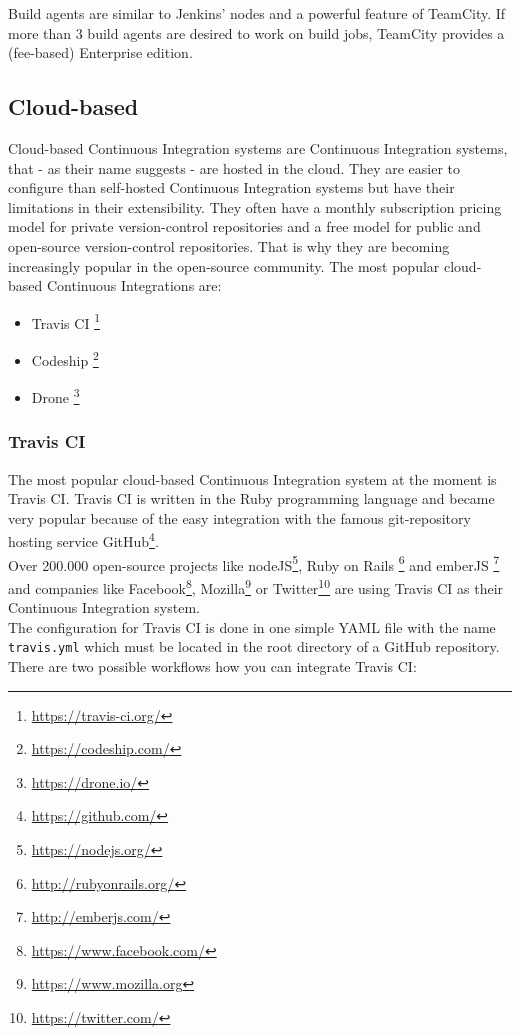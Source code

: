 Build agents are similar to Jenkins' nodes and a powerful feature of TeamCity.
If more than 3 build agents are desired to work on build jobs, TeamCity provides
a (fee-based) Enterprise edition.

\subsection{Cloud-based}\label{sec:tooling-cloud-based}

Cloud-based Continuous Integration systems are Continuous Integration systems,
that - as their name suggests - are hosted in the cloud. They are easier to
configure than self-hosted Continuous Integration systems but have their
limitations in their extensibility. They often have a monthly subscription
pricing model for private version-control repositories and a free model for
public and open-source version-control repositories. That is why they are
becoming increasingly popular in the open-source community. The most popular
cloud-based Continuous Integrations are: 

\begin{itemize} 
    \item Travis CI \footnote{\url{https://travis-ci.org/}}
    \item Codeship \footnote{\url{https://codeship.com/}}
    \item Drone \footnote{\url{https://drone.io/}}
\end{itemize}

\subsubsection{Travis CI}

The most popular cloud-based Continuous Integration system at the moment is
Travis CI. Travis CI is written in the Ruby programming language and became
very popular because of the easy integration with the famous git-repository
hosting service GitHub\footnote{\url{https://github.com/}}.\\

Over 200.000 open-source projects like
nodeJS\footnote{\url{https://nodejs.org/}}, Ruby on Rails
\footnote{\url{http://rubyonrails.org/}} and emberJS
\footnote{\url{http://emberjs.com/}} and companies like
Facebook\footnote{\url{https://www.facebook.com/}},
Mozilla\footnote{\url{https://www.mozilla.org}} or
Twitter\footnote{\url{https://twitter.com/}} are using Travis CI as their
Continuous Integration system.\\ The configuration for Travis CI is done in one
simple YAML file with the name \lstinline|travis.yml| which must be located in
the root directory of a GitHub repository. There are two possible workflows how
you can integrate Travis CI:


